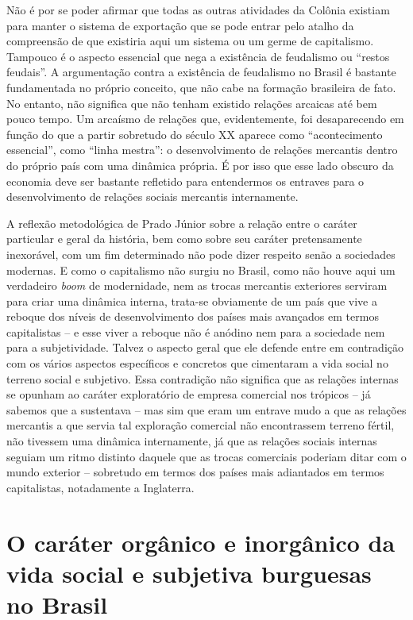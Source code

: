 Não é por se poder afirmar que todas as outras atividades da Colônia
existiam para manter o sistema de exportação que se pode entrar pelo
atalho da compreensão de que existiria aqui um sistema ou um germe de
capitalismo. Tampouco é o aspecto essencial que nega a existência de
feudalismo ou ``restos feudais''. A argumentação contra a existência de
feudalismo no Brasil é bastante fundamentada no próprio conceito, que
não cabe na formação brasileira de fato. No entanto, não significa que
não tenham existido relações arcaicas até bem pouco tempo. Um arcaísmo
de relações que, evidentemente, foi desaparecendo em função do que a
partir sobretudo do século XX aparece como ``acontecimento essencial'',
como ``linha mestra'': o desenvolvimento de relações mercantis dentro do
próprio país com uma dinâmica própria. É por isso que esse lado obscuro
da economia deve ser bastante refletido para entendermos os entraves
para o desenvolvimento de relações sociais mercantis internamente.

A reflexão metodológica de Prado Júnior sobre a relação entre o caráter
particular e geral da história, bem como sobre seu caráter pretensamente
inexorável, com um fim determinado não pode dizer respeito senão a
sociedades modernas. E como o capitalismo não surgiu no Brasil, como não
houve aqui um verdadeiro \emph{boom} de modernidade, nem as trocas
mercantis exteriores serviram para criar uma dinâmica interna, trata-se
obviamente de um país que vive a reboque dos níveis de desenvolvimento
dos países mais avançados em termos capitalistas -- e esse viver a
reboque não é anódino nem para a sociedade nem para a subjetividade.
Talvez o aspecto geral que ele defende entre em contradição com os
vários aspectos específicos e concretos que cimentaram a vida social no
terreno social e subjetivo. Essa contradição não significa que as
relações internas se opunham ao caráter exploratório de empresa
comercial nos trópicos -- já sabemos que a sustentava -- mas sim que
eram um entrave mudo a que as relações mercantis a que servia tal
exploração comercial não encontrassem terreno fértil, não tivessem uma
dinâmica internamente, já que as relações sociais internas seguiam um
ritmo distinto daquele que as trocas comerciais poderiam ditar com o
mundo exterior -- sobretudo em termos dos países mais adiantados em
termos capitalistas, notadamente a Inglaterra.

\section{O caráter orgânico e inorgânico da vida social e subjetiva burguesas no Brasil}

